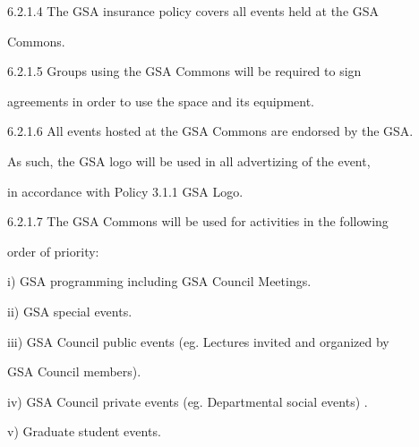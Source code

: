 6.2.1.4   The  GSA  insurance  policy  covers  all  events  held  at  the  GSA  

             Commons.   



  



6.2.1.5   Groups   using   the   GSA   Commons   will   be   required   to   sign  

             agreements in order to use the space and its equipment.   



  



6.2.1.6  All events hosted at the GSA Commons are endorsed by the GSA.  

             As  such, the GSA logo will be used in all advertizing of the event,  

             in accordance with Policy 3.1.1 GSA Logo.   



  



6.2.1.7   The  GSA  Commons  will  be  used  for  activities  in  the  following  

             order of priority:   



  



     i)       GSA programming including GSA Council Meetings.   



  



     ii)      GSA special events.   



  



     iii)     GSA Council public events (eg. Lectures invited and organized by  

              GSA Council members).  



  



     iv)      GSA Council private events (eg. Departmental social events) .   



  



     v)       Graduate student events.   



